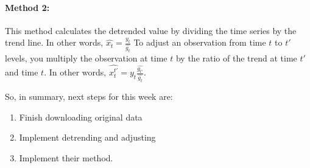 \documentclass[11pt]{article}
\begin{document}
\paragraph{Method 2:} This method calculates the detrended value by dividing the time series by the trend line. In other words, $\hat{x_t} = \frac{y_t}{\hat{g_t}}$ To adjust an observation from time $t$ to $t'$ levels, you multiply the observation at time $t$ by the ratio of the trend at time $t'$ and time $t$. In other words, $\hat{x^{t'}_t} = y_t\frac{\hat{g_{t'}}}{\hat{g_t}}$.

So, in summary, next steps for this week are: 
\begin{enumerate}
    \item Finish downloading original data
    \item Implement detrending and adjusting
    \item Implement their method. 
\end{enumerate}
\end{document}
